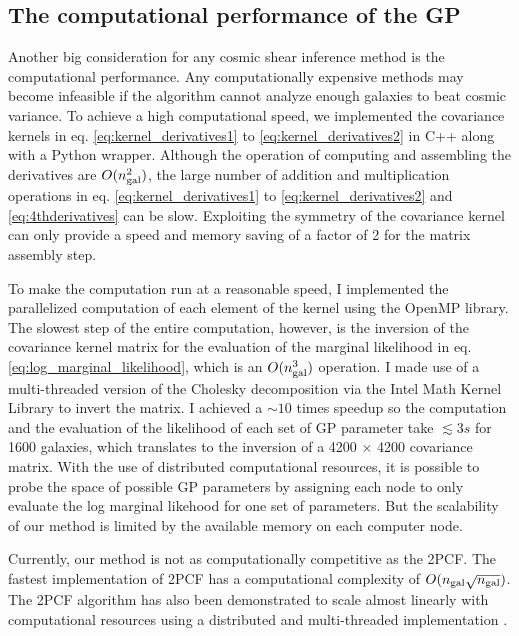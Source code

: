 \subsection{The computational performance of the GP}
\label{subsec:computational_performance}
Another big consideration for any cosmic shear inference method is the computational performance.
Any
computationally expensive methods may become infeasible if the algorithm cannot 
analyze enough galaxies to beat cosmic variance. 
To achieve a high computational speed, we  
implemented the covariance kernels in eq. \ref{eq:kernel_derivatives1} to
\ref{eq:kernel_derivatives2}
in {\sc C++} along with a {\sc Python} wrapper. 
Although the operation of computing and assembling the
derivatives are $O(n_{\rm gal}^2)$, the large number of addition and 
multiplication operations in eq. \ref{eq:kernel_derivatives1} to
\ref{eq:kernel_derivatives2} and \ref{eq:4thderivatives} can be slow.
Exploiting the symmetry of the covariance kernel can only provide 
a speed and memory saving of a factor of 2 for the matrix assembly step.

To make the computation run at a reasonable speed, 
I implemented the parallelized computation of each element of the kernel using 
the {\sc OpenMP} library. The slowest step of the entire computation, however, 
is the inversion of the
covariance kernel matrix for the evaluation of the marginal likelihood in eq.
\ref{eq:log_marginal_likelihood}, 
which is an $O(n_{\rm gal}^3)$ operation. 
I made use of a multi-threaded version of the Cholesky decomposition via the {\sc Intel Math
Kernel Library} to invert the matrix. I achieved a $\sim10$ 
times speedup so the computation and the evaluation of the likelihood of each set of GP parameter
take $\lesssim 3s$ for 1600 galaxies, which translates to 
the inversion of a 4200 $\times$ 4200 covariance matrix.
With the use of distributed computational resources, it is possible 
to probe the space of possible GP parameters by assigning each node to only
evaluate the log marginal likehood for one set of parameters. 
But the scalability of our method is limited by the available memory on each
computer node.

Currently, our method is not as computationally competitive as the 2PCF. 
The fastest implementation of 2PCF has a computational complexity of
$O(n_{\rm gal}\sqrt{n_{\rm gal}})$.
The 2PCF algorithm has also been demonstrated to scale almost linearly with
computational resources 
using a distributed and multi-threaded implementation \citep{Chhugani2012}. 

